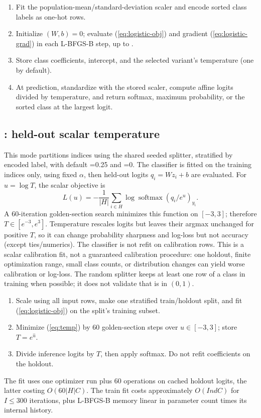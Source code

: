 \documentclass[conference]{IEEEtran}
\begin{document}
\begin{enumerate}
\item Fit the population-mean/standard-deviation scaler and encode sorted class labels as one-hot rows.
\item Initialize \((W,b)=0\); evaluate (\ref{eq:logistic-obj}) and gradient (\ref{eq:logistic-grad}) in each L-BFGS-B step, up to .
\item Store class coefficients, intercept, and the selected variant's temperature (one by default).
\item At prediction, standardize with the stored scaler, compute affine logits divided by temperature, and return softmax, maximum probability, or the sorted class at the largest logit.
\end{enumerate}

\subsection{: held-out scalar temperature}
This mode partitions indices using the shared seeded splitter, stratified by encoded label, with default =0.25 and =0. The classifier is fitted on the training indices only, using fixed \(\alpha\), then held-out logits \(q_i=Wz_i+b\) are evaluated. For \(u=\log T\), the scalar objective is
\begin{equation}
L(u)=-\frac{1}{|H|}\sum_{i\in H}\log\operatorname{softmax}(q_i/e^u)_{y_i}.
\label{eq:temp}
\end{equation}
A 60-iteration golden-section search minimizes this function on \([-3,3]\); therefore \(T\in[e^{-3},e^3]\). Temperature rescales logits but leaves their argmax unchanged for positive \(T\), so it can change probability sharpness and log-loss but not accuracy (except ties/numerics). The classifier is not refit on calibration rows. This is a scalar calibration fit, not a guaranteed calibration procedure: one holdout, finite optimization range, small class counts, or distribution changes can yield worse calibration or log-loss. The random splitter keeps at least one row of a class in training when possible; it does not validate that  is in \((0,1)\).
\begin{enumerate}
\item Scale using all input rows, make one stratified train/holdout split, and fit (\ref{eq:logistic-obj}) on the split's training subset.
\item Minimize (\ref{eq:temp}) by 60 golden-section steps over \(u\in[-3,3]\); store \(T=e^{\hat u}\).
\item Divide inference logits by \(T\), then apply softmax. Do not refit coefficients on the holdout.
\end{enumerate}
The fit uses one optimizer run plus 60 operations on cached holdout logits, the latter costing \(O(60|H|C)\). The train fit costs approximately \(O(I n d C)\) for \(I\leq300\) iterations, plus L-BFGS-B memory linear in parameter count times its internal history.
\end{document}
